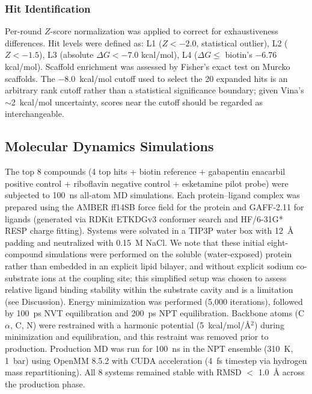\documentclass[pdflatex,sn-nature]{sn-jnl}
\begin{document}
\subsubsection*{Hit Identification}
Per-round $Z$-score normalization was applied to correct for exhaustiveness differences. Hit levels were defined as: L1 ($Z < -2.0$, statistical outlier), L2 ($Z < -1.5$), L3 (absolute $\Delta G < -7.0$ kcal/mol), L4 ($\Delta G \leq$ biotin's $-$6.76 kcal/mol). Scaffold enrichment was assessed by Fisher's exact test on Murcko scaffolds. The $-$8.0~kcal/mol cutoff used to select the 20 expanded hits is an arbitrary rank cutoff rather than a statistical significance boundary; given Vina's $\sim$2~kcal/mol uncertainty, scores near the cutoff should be regarded as interchangeable.

\subsection*{Molecular Dynamics Simulations}

The top 8 compounds (4 top hits + biotin reference + gabapentin enacarbil positive control + riboflavin negative control + esketamine pilot probe) were subjected to 100~ns all-atom MD simulations. Each protein--ligand complex was prepared using the AMBER ff14SB force field for the protein and GAFF-2.11 for ligands (generated via RDKit ETKDGv3 conformer search and HF/6-31G* RESP charge fitting). Systems were solvated in a TIP3P water box with 12~\AA{} padding and neutralized with 0.15~M NaCl. We note that these initial eight-compound simulations were performed on the soluble (water-exposed) protein rather than embedded in an explicit lipid bilayer, and without explicit sodium co-substrate ions at the coupling site; this simplified setup was chosen to assess relative ligand binding stability within the substrate cavity and is a limitation (see Discussion). Energy minimization was performed (5,000 iterations), followed by 100~ps NVT equilibration and 200~ps NPT equilibration. Backbone atoms (C$\alpha$, C, N) were restrained with a harmonic potential (5~kcal/mol/\AA{}$^2$) during minimization and equilibration, and this restraint was removed prior to production. Production MD was run for 100~ns in the NPT ensemble (310~K, 1~bar) using OpenMM 8.5.2 with CUDA acceleration (4~fs timestep via hydrogen mass repartitioning). All 8 systems remained stable with RMSD $<$ 1.0~\AA{} across the production phase.
\end{document}
